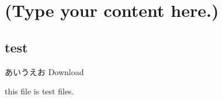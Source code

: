 \documentclass[uplatex]{jsbook}
\begin{document}
\chapter{(Type your content here.)}
\section{test}

あいうえお
Download 

this file is test files.
\end{document}
